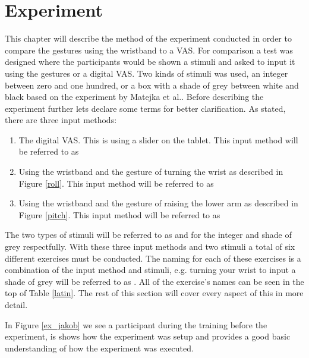 \chapter{Experiment}

This chapter will describe the method of the experiment conducted in order to compare the gestures using the wristband to a VAS. For comparison a test was designed where the participants would be shown a stimuli and asked to input it using the gestures or a digital VAS. Two kinds of stimuli was used, an integer between zero and one hundred, or a box with a shade of grey between white and black based on the experiment by Matejka et al.\cite{grey}. Before describing the experiment further lets declare some terms for better clarification. As stated, there are three input methods:

\begin{enumerate}
\item The digital VAS. This is using a slider on the tablet. This input method will be referred to as 
\item Using the wristband and the gesture of turning the wrist as described in Figure \ref{roll}. This input method will be referred to as 
\item Using the wristband and the gesture of raising the lower arm as described in Figure \ref{pitch}. This input method will be referred to as 
\end{enumerate}

The two types of stimuli will be referred to as  and  for the integer and shade of grey respectfully. With these three input methods and two stimuli a total of six different exercises must be conducted. The naming for each of these exercises is a combination of the input method and stimuli, e.g. turning your wrist to input a shade of grey will be referred to as . All of the exercise's names can be seen in the top of Table \ref{latin}. The rest of this section will cover every aspect of this in more detail.

In Figure \ref{ex_jakob} we see a participant during the training before the experiment, is shows how the experiment was setup and provides a good basic understanding of how the experiment was executed.

